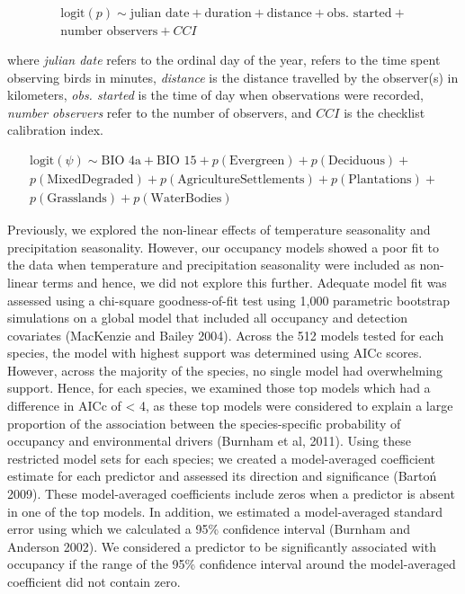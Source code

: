 \begin{multline*}
    \text{logit}(p) \sim \text{julian date} + \text{duration} + \text{distance} + \text{obs. started} + \\
    \text{number observers} + CCI    
\end{multline*}

where \textit{julian date} refers to the ordinal day of the year,  refers to the time spent observing birds in minutes, \textit{distance} is the distance travelled by the observer(s) in kilometers, \textit{obs. started} is the time of day when observations were recorded, \textit{number observers} refer to the number of observers, and $CCI$ is the checklist calibration index.

\begin{multline*}
    \text{logit}(\psi) \sim \text{BIO 4a} + \text{BIO 15} + p(\text{Evergreen}) + p(\text{Deciduous}) + \\
    p(\text{MixedDegraded}) + p(\text{AgricultureSettlements}) + p(\text{Plantations}) + \\
    p(\text{Grasslands}) + p(\text{WaterBodies})
\end{multline*}

Previously, we explored the non-linear effects of temperature seasonality and precipitation seasonality.
However, our occupancy models showed a poor fit to the data when temperature and precipitation seasonality were included as non-linear terms and hence, we did not explore this further.
Adequate model fit was assessed using a chi-square goodness-of-fit test using 1,000 parametric bootstrap simulations on a global model that included all occupancy and detection covariates (MacKenzie and Bailey 2004).
Across the 512 models tested for each species, the model with highest support was determined using AICc scores.
However, across the majority of the species, no single model had overwhelming support.
Hence, for each species, we examined those top models which had a difference in AICc of < 4, as these top models were considered to explain a large proportion of the association between the species-specific probability of occupancy and environmental drivers (Burnham et al, 2011).
Using these restricted model sets for each species; we created a model-averaged coefficient estimate for each predictor and assessed its direction and significance (Bartoń 2009).
These model-averaged coefficients include zeros when a predictor is absent in one of the top models.
In addition, we estimated a model-averaged standard error using which we calculated a 95\% confidence interval (Burnham and Anderson 2002).
We considered a predictor to be significantly associated with occupancy if the range of the 95\% confidence interval around the model-averaged coefficient did not contain zero.

